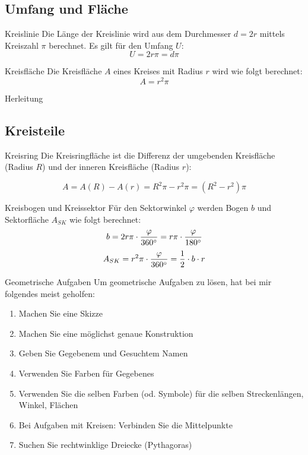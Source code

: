 \subsection{Umfang und Fläche}

\begin{gesetz}{Kreislinie}{}\index{$\pi$}
  Die Länge der Kreislinie wird aus dem Durchmesser $d=2r$  mittels Kreiszahl
  $\pi$ berechnet. Es gilt für den Umfang $U$:
  $$U = 2r\pi = d\pi$$
\end{gesetz}

\begin{gesetz}{Kreisfläche}{}
  Die Kreisfläche $A$ eines Kreises mit Radius $r$ wird wie folgt
  berechnet:
  $$A = r^2\pi$$
\end{gesetz}
Herleitung

\subsection{Kreisteile}
\begin{gesetz}{Kreisring}{}
  Die Kreisringfläche ist die Differenz der umgebenden Kreisfläche
  (Radius $R$) und
  der inneren Kreisfläche (Radius $r$):

  $$A = A(R) - A(r) = R^2\pi - r^2\pi = (R^2-r^2)\pi$$
\end{gesetz}

\begin{gesetz}{Kreisbogen und
    Kreissektor}{}
  Für den Sektorwinkel $\varphi$ werden Bogen $b$ und Sektorfläche
  $A_{SK}$ wie folgt berechnet:
  $$b = 2r\pi \cdot{}\frac{\varphi}{360^\circ} =
  r\pi\cdot{}\frac{\varphi}{180^\circ}$$
  $$A_{SK} = r^2\pi\cdot{}\frac{\varphi}{360^\circ} = \frac12\cdot{}b\cdot{}r$$
  \end{gesetz}
  
\begin{rezept}{Geometrische Aufgaben}{}
Um geometrische Aufgaben zu lösen, hat bei mir folgendes meist geholfen:

\begin{enumerate}
\item Machen Sie eine Skizze
\item Machen Sie eine möglichst genaue Konstruktion
\item Geben Sie Gegebenem und Gesuchtem Namen
\item Verwenden Sie Farben für Gegebenes
\item Verwenden Sie die selben Farben (od. Symbole) für die selben Streckenlängen, Winkel, Flächen
\item Bei Aufgaben mit Kreisen: Verbinden Sie die Mittelpunkte 
\item Suchen Sie rechtwinklige Dreiecke (Pythagoras)

\end{enumerate}
\end{rezept}  

